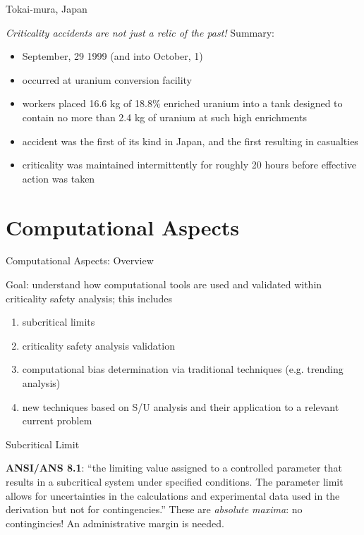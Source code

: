 \documentclass[10pt]{beamer}
\begin{document}
\begin{frame}{Tokai-mura, Japan}

{\it Criticality accidents are not just a relic of the past!}
\vfill
Summary:
\begin{itemize}
 \item September, 29 1999 (and into October, 1)
 \item occurred at uranium conversion facility
 \item workers placed 16.6 kg of 18.8\%
       enriched uranium into a tank designed to contain no more than
       2.4 kg of uranium at such high enrichments
 \item accident was the first of its kind in Japan, and the first 
       resulting in casualties
 \item criticality was maintained intermittently for roughly 20 hours before 
       effective action was taken
\end{itemize}

\end{frame}

\section{Computational Aspects}

\begin{frame}{Computational Aspects: Overview}

Goal: understand how computational tools are used and validated within
      criticality safety analysis; this includes
\begin{enumerate}
 \item subcritical limits
 \item criticality safety analysis validation
 \item computational bias determination via traditional techniques (e.g.
       trending analysis)
 \item new techniques based on S/U analysis and their application to 
       a relevant current problem
\end{enumerate}

\end{frame}

\begin{frame}{Subcritical Limit}

{\bf ANSI/ANS 8.1}: ``the 
limiting value assigned to a controlled parameter that results in a subcritical 
system under specified conditions. The parameter limit allows for 
uncertainties in the calculations and experimental data used in the derivation 
but not for contingencies.''
\vfill
These are \textit{absolute maxima}: no contingincies! An administrative
margin is needed.
\end{frame}
\end{document}
